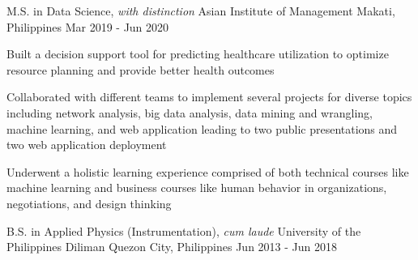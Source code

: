 

\begin{cventries}

  \cventry
    {M.S. in Data Science, \textit{with distinction}} %
    {Asian Institute of Management} %
    {Makati, Philippines} %
    {Mar 2019 - Jun 2020} %
    {
      \begin{cvitems} %
        \item{Built a decision support tool for predicting healthcare utilization to optimize resource planning and provide better health outcomes}
        \item{Collaborated with different teams to implement several projects for diverse topics including network analysis, big data analysis, data mining and wrangling, machine learning, and web application leading to two public presentations and two web application deployment}
        \item{Underwent a holistic learning experience comprised of both technical courses like machine learning and business courses like human behavior in organizations, negotiations, and design thinking}
      \end{cvitems}
    }

  \cventry
    {B.S. in Applied Physics (Instrumentation), \textit{cum laude}} %
    {University of the Philippines Diliman} %
    {Quezon City, Philippines} %
    {Jun 2013 - Jun 2018} %
    {}
\end{cventries}
\vspace{-1.5em}